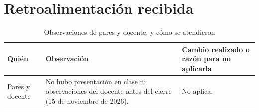 \section{Retroalimentación recibida}
\label{sec:retroalimentacion}

\begin{table}[H]
  \centering
  \small
  \caption{Observaciones de pares y docente, y cómo se atendieron}
  \label{tab:retroalimentacion}
  \begin{tabularx}{\textwidth}{@{}p{2.4cm}LL@{}}
    \toprule
    \textbf{Quién} & \textbf{Observación} & \textbf{Cambio realizado o razón para no aplicarla} \\
    \midrule
    Pares y docente & No hubo presentación en clase ni observaciones del docente antes del cierre (15 de noviembre de 2026). & No aplica. \\
    \bottomrule
  \end{tabularx}
\end{table}
